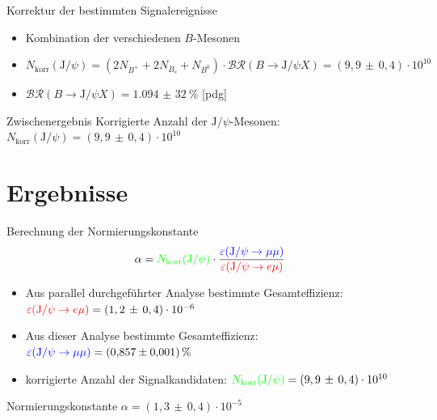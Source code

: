 \begin{frame}[t]{Korrektur der bestimmten Signalereignisse}
  \begin{itemize} \setlength\itemsep{0.4cm}
    \item Kombination der verschiedenen $B$-Mesonen
    \item $N_\mathrm{korr}(\text{J}/\psi)=(2N_{B^+}+2N_{B_s}+N_{B^0})\cdot\mathcal{BR}(B\rightarrow\text{J}/\psi X)=(9,9\,\pm\,0,4)\cdot10^{10}$
    \item $\mathcal{BR}(B\rightarrow\text{J}/\psi X)=\SI{1,094(32)}{\percent}$ [pdg]
  \end{itemize}
  \begin{block}{Zwischenergebnis}
    \centering
    Korrigierte Anzahl der $\text{J}/\psi$-Mesonen: $N_\mathrm{korr}(\text{J}/\psi)=(9,9\,\pm\,0,4)\cdot10^{10}$
  \end{block}
\end{frame}

\section{Ergebnisse}

\begin{frame}[t]{Berechnung der Normierungskonstante}
  \begin{equation*}
    \alpha=\textcolor{green}{N_\text{korr}(\text{J}/\psi)}\cdot\frac{\textcolor{blue}{\varepsilon(\text{J}/\psi\rightarrow\mu\mu)}}{\textcolor{red}{\varepsilon(\text{J}/\psi\rightarrow e\mu)}}
  \end{equation*}
  \begin{itemize}
    \item Aus parallel durchgeführter Analyse bestimmte Gesamteffizienz: $\textcolor{red}{\varepsilon(\text{J}/\psi\rightarrow e\mu)}=(1,2\,\pm\,0,4)\cdot10^{-6}$
    \item Aus dieser Analyse bestimmte Gesamteffizienz: $\textcolor{blue}{\varepsilon(\text{J}/\psi\rightarrow\mu\mu)}=\SI{0,857(1)}{\percent}$
    \item korrigierte Anzahl der Signalkandidaten: $\textcolor{green}{N_\mathrm{korr}(\text{J}/\psi)}=(9,9\,\pm\,0,4)\cdot10^{10}$
  \end{itemize}
  \begin{block}{Normierungskonstante}
    \centering
    $\alpha=(1,3\,\pm\,0,4)\cdot10^{-5}$
  \end{block}
\end{frame}

